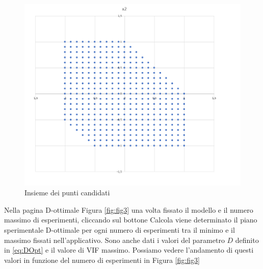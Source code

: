 \documentclass[
  11pt,
]{book}
\begin{document}
\begin{figure}[ht]

{\centering \includegraphics[width=1\linewidth]{Immagini/D_opt/02_es1_pticandidati} 

}

\caption{Insieme dei punti candidati}\label{fig:fig2}
\end{figure}

Nella pagina D-ottimale Figura \ref{fig:fig3} una volta fissato il modello e il numero massimo di esperimenti, cliccando sul bottone Calcola viene determinato il piano sperimentale D-ottimale per ogni numero di esperimenti tra il minimo e il massimo fissati nell'applicativo. Sono anche dati i valori del parametro \(D\) definito in \eqref{eq:DOpt} e il valore di VIF massimo. Possiamo vedere l'andamento di questi valori in funzione del numero di esperimenti in Figura \ref{fig:fig3}
\end{document}

